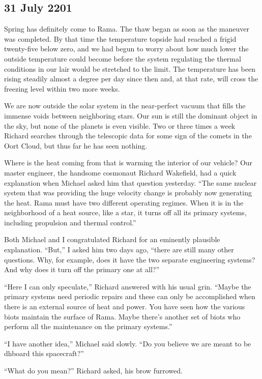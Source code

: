 \documentclass[]{article}
\begin{document}
\subsection*{31 July 2201}

Spring has definitely come to Rama.  The thaw began as soon as the maneuver was completed.  By that time the temperature topside had reached a frigid twenty-five below zero, and we had begun to worry about how much lower the outside temperature could become before the system regulating the thermal conditions in our lair would be stretched to the limit.  The temperature has been rising steadily almost a degree per day since then and, at that rate, will cross the freezing level within two more weeks.

We are now outside the solar system in the near-perfect vacuum that fills the immense voids between neighboring stars.  Our sun is still the dominant object in the sky, but none of the planets is even visible.  Two or three times a week Richard searches through the telescopic data for some sign of the comets in the Oort Cloud, but thus far he has seen nothing.

Where is the heat coming from that is warming the interior of our vehicle? Our master engineer, the handsome cosmonaut Richard Wakefield, had a quick explanation when Michael asked him that question yesterday.  “The same nuclear system that was providing the huge velocity change is probably now generating the heat.  Rama must have two different operating regimes.  When it is in the neighborhood of a heat source, like a star, it turns off all its primary systems, including propulsion and thermal control.”

Both Michael and I congratulated Richard for an eminently plausible explanation.  “But,” I asked him two days ago, “there are still many other questions.  Why, for example, does it have the two separate engineering systems? And why does it turn off the primary one at all?”

“Here I can only speculate,” Richard answered with his usual grin.  “Maybe the primary systems need periodic repairs and these can only be accomplished when there is an external source of heat and power.  You have seen how the various biots maintain the surface of Rama.  Maybe there’s another set of biots who perform all the maintenance on the primary systems.”

“I have another idea,” Michael said slowly.  “Do you believe we are meant to be dhboard this spacecraft?”

“What do you mean?” Richard asked, his brow furrowed.
\end{document}
